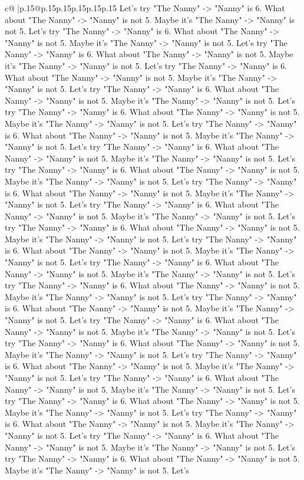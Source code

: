 \documentclass{article}
\begin{document}
{\begin{supertabular}{c@{$\;$}|p{.15\linewidth}@{}p{.15\linewidth}p{.15\linewidth}p{.15\linewidth}p{.15\linewidth}p{.15\linewidth}}
{{{Let's try "The Nanny" {-}> "Nanny" is 6. What about "The Nanny" {-}> "Nanny" is not 5. Maybe it's "The Nanny" {-}> "Nanny" is not 5. Let's try "The Nanny" {-}> "Nanny" is 6. What about "The Nanny" {-}> "Nanny" is not 5. Maybe it's "The Nanny" {-}> "Nanny" is not 5. Let's try "The Nanny" {-}> "Nanny" is 6. What about "The Nanny" {-}> "Nanny" is not 5. Maybe it's "The Nanny" {-}> "Nanny" is not 5. Let's try "The Nanny" {-}> "Nanny" is 6. What about "The Nanny" {-}> "Nanny" is not 5. Maybe it's "The Nanny" {-}> "Nanny" is not 5. Let's try "The Nanny" {-}> "Nanny" is 6. What about "The Nanny" {-}> "Nanny" is not 5. Maybe it's "The Nanny" {-}> "Nanny" is not 5. Let's try "The Nanny" {-}> "Nanny" is 6. What about "The Nanny" {-}> "Nanny" is not 5. Maybe it's "The Nanny" {-}> "Nanny" is not 5. Let's try "The Nanny" {-}> "Nanny" is 6. What about "The Nanny" {-}> "Nanny" is not 5. Maybe it's "The Nanny" {-}> "Nanny" is not 5. Let's try "The Nanny" {-}> "Nanny" is 6. What about "The Nanny" {-}> "Nanny" is not 5. Maybe it's "The Nanny" {-}> "Nanny" is not 5. Let's try "The Nanny" {-}> "Nanny" is 6. What about "The Nanny" {-}> "Nanny" is not 5. Maybe it's "The Nanny" {-}> "Nanny" is not 5. Let's try "The Nanny" {-}> "Nanny" is 6. What about "The Nanny" {-}> "Nanny" is not 5. Maybe it's "The Nanny" {-}> "Nanny" is not 5. Let's try "The Nanny" {-}> "Nanny" is 6. What about "The Nanny" {-}> "Nanny" is not 5. Maybe it's "The Nanny" {-}> "Nanny" is not 5. Let's try "The Nanny" {-}> "Nanny" is 6. What about "The Nanny" {-}> "Nanny" is not 5. Maybe it's "The Nanny" {-}> "Nanny" is not 5. Let's try "The Nanny" {-}> "Nanny" is 6. What about "The Nanny" {-}> "Nanny" is not 5. Maybe it's "The Nanny" {-}> "Nanny" is not 5. Let's try "The Nanny" {-}> "Nanny" is 6. What about "The Nanny" {-}> "Nanny" is not 5. Maybe it's "The Nanny" {-}> "Nanny" is not 5. Let's try "The Nanny" {-}> "Nanny" is 6. What about "The Nanny" {-}> "Nanny" is not 5. Maybe it's "The Nanny" {-}> "Nanny" is not 5. Let's try "The Nanny" {-}> "Nanny" is 6. What about "The Nanny" {-}> "Nanny" is not 5. Maybe it's "The Nanny" {-}> "Nanny" is not 5. Let's try "The Nanny" {-}> "Nanny" is 6. What about "The Nanny" {-}> "Nanny" is not 5. Maybe it's "The Nanny" {-}> "Nanny" is not 5. Let's try "The Nanny" {-}> "Nanny" is 6. What about "The Nanny" {-}> "Nanny" is not 5. Maybe it's "The Nanny" {-}> "Nanny" is not 5. Let's try "The Nanny" {-}> "Nanny" is 6. What about "The Nanny" {-}> "Nanny" is not 5. Maybe it's "The Nanny" {-}> "Nanny" is not 5. Let's try "The Nanny" {-}> "Nanny" is 6. What about "The Nanny" {-}> "Nanny" is not 5. Maybe it's "The Nanny" {-}> "Nanny" is not 5. Let's try "The Nanny" {-}> "Nanny" is 6. What about "The Nanny" {-}> "Nanny" is not 5. Maybe it's "The Nanny" {-}> "Nanny" is not 5. Let's try "The Nanny" {-}> "Nanny" is 6. What about "The Nanny" {-}> "Nanny" is not 5. Maybe it's "The Nanny" {-}> "Nanny" is not 5. Let's try "The Nanny" {-}> "Nanny" is 6. What about "The Nanny" {-}> "Nanny" is not 5. Maybe it's "The Nanny" {-}> "Nanny" is not 5. Let's try "The Nanny" {-}> "Nanny" is 6. What about "The Nanny" {-}> "Nanny" is not 5. Maybe it's "The Nanny" {-}> "Nanny" is not 5. Let's }}}
\end{supertabular}}
\end{document}
